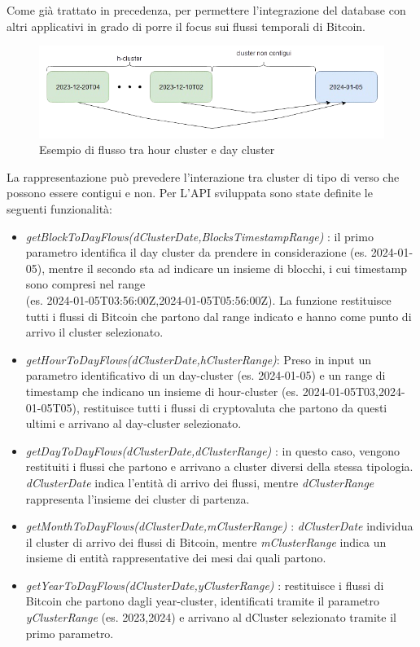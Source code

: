 Come già trattato in precedenza, per permettere l'integrazione del database con altri applicativi in grado di porre il focus sui flussi temporali di Bitcoin.

\begin{figure}[H]
    \centering \includegraphics[keepaspectratio=true,scale=0.6]{Images/FlowsExampleQuery.png}
    \caption{Esempio di flusso tra hour cluster e day cluster}
\end{figure}

La rappresentazione può prevedere l'interazione tra cluster di tipo di verso che possono essere contigui e non. Per L'API sviluppata sono state definite le seguenti funzionalità:
\thispagestyle{mystyle}
\begin{itemize}

    \item \emph{getBlockToDayFlows(dClusterDate,BlocksTimestampRange)} : il primo parametro identifica il day cluster da prendere in considerazione (es. 2024-01-05), mentre il secondo sta ad indicare un insieme di blocchi, i cui timestamp sono compresi nel range \\ (es. 2024-01-05T03:56:00Z,2024-01-05T05:56:00Z).
    La funzione restituisce tutti i flussi di Bitcoin che partono dal range indicato e hanno come punto di arrivo il cluster selezionato.
    
    \item \emph{getHourToDayFlows(dClusterDate,hClusterRange)}:
    Preso in input un parametro identificativo di un day-cluster (es. 2024-01-05) e un range di timestamp che indicano un insieme di hour-cluster (es.  2024-01-05T03,2024-01-05T05), restituisce tutti i flussi di cryptovaluta che partono da questi ultimi e arrivano al day-cluster selezionato.
    
    \item \emph{getDayToDayFlows(dClusterDate,dClusterRange)} : in questo caso, vengono restituiti i flussi che partono e arrivano a cluster diversi della stessa tipologia. 
    \textit{dClusterDate} indica l'entità di arrivo dei flussi, mentre \textit{dClusterRange} rappresenta l'insieme dei cluster di partenza.

    
    \item \emph{getMonthToDayFlows(dClusterDate,mClusterRange)} : \emph{dClusterDate} individua il cluster di arrivo dei flussi di Bitcoin, mentre \emph{mClusterRange} indica un insieme di entità rappresentative dei mesi dai quali partono.
    
    \item \emph{getYearToDayFlows(dClusterDate,yClusterRange)} : restituisce i flussi di Bitcoin che partono dagli year-cluster, identificati tramite il parametro \emph{yClusterRange} (es. 2023,2024) e arrivano al dCluster selezionato tramite il primo parametro.
\end{itemize}


